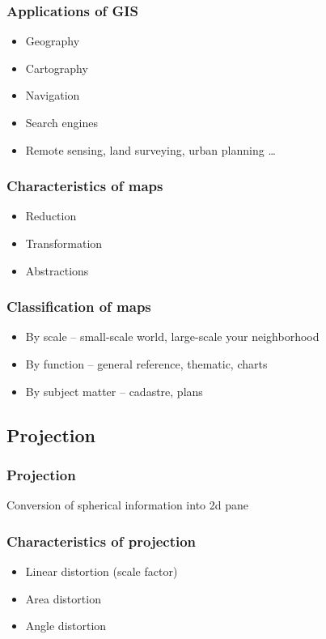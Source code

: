 \documentclass{beamer}
\begin{document}
\begin{frame}
  \frametitle{Applications of GIS}
  \begin{itemize}
  \item Geography
  \item Cartography
  \item Navigation
  \item Search engines
  \item Remote sensing, land surveying, urban planning \ldots{}
  \end{itemize}
\end{frame}

\begin{frame}
  \frametitle{Characteristics of maps}
  \begin{itemize}
  \item<1-> Reduction 
  \item<3-> Transformation 
  \item<5-> Abstractions 
  \end{itemize}
\end{frame}

\begin{frame}
  \frametitle{Classification of maps}
  \begin{itemize}
  \item By scale -- small-scale world, large-scale your neighborhood
  \item By function -- general reference, thematic, charts
  \item By subject matter -- cadastre, plans
  \end{itemize}
\end{frame}


\subsection{Projection}

\begin{frame}
  \frametitle{Projection}
  Conversion of spherical information into 2d pane
\end{frame}

\begin{frame}
  \frametitle{Characteristics of projection}
  \begin{itemize}
  \item Linear distortion (scale factor)
  \item Area distortion
  \item Angle distortion
  \end{itemize}
\end{frame}
\end{document}
